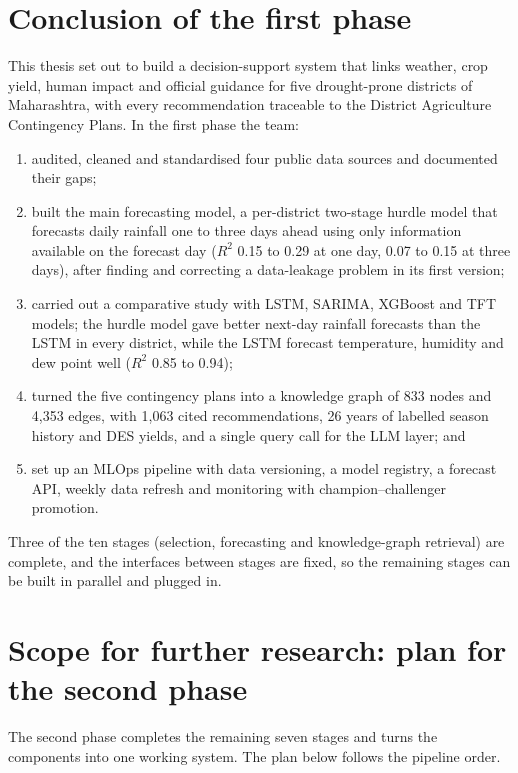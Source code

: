 \label{chap.conclusion}
\section{Conclusion of the first phase}
This thesis set out to build a decision-support system that links weather, crop yield, human impact and official guidance for five drought-prone districts of Maharashtra, with every recommendation traceable to the District Agriculture Contingency Plans. In the first phase the team:

\begin{enumerate}
	\item audited, cleaned and standardised four public data sources and documented their gaps;
	\item built the main forecasting model, a per-district two-stage hurdle model that forecasts daily rainfall one to three days ahead using only information available on the forecast day ($R^2$ 0.15 to 0.29 at one day, 0.07 to 0.15 at three days), after finding and correcting a data-leakage problem in its first version;
	\item carried out a comparative study with LSTM, SARIMA, XGBoost and TFT models; the hurdle model gave better next-day rainfall forecasts than the LSTM in every district, while the LSTM forecast temperature, humidity and dew point well ($R^2$ 0.85 to 0.94);
	\item turned the five contingency plans into a knowledge graph of 833 nodes and 4,353 edges, with 1,063 cited recommendations, 26 years of labelled season history and DES yields, and a single query call for the LLM layer; and
	\item set up an MLOps pipeline with data versioning, a model registry, a forecast API, weekly data refresh and monitoring with champion--challenger promotion.
\end{enumerate}

Three of the ten stages (selection, forecasting and knowledge-graph retrieval) are complete, and the interfaces between stages are fixed, so the remaining stages can be built in parallel and plugged in.

\section{Scope for further research: plan for the second phase}
The second phase completes the remaining seven stages and turns the components into one working system. The plan below follows the pipeline order.

